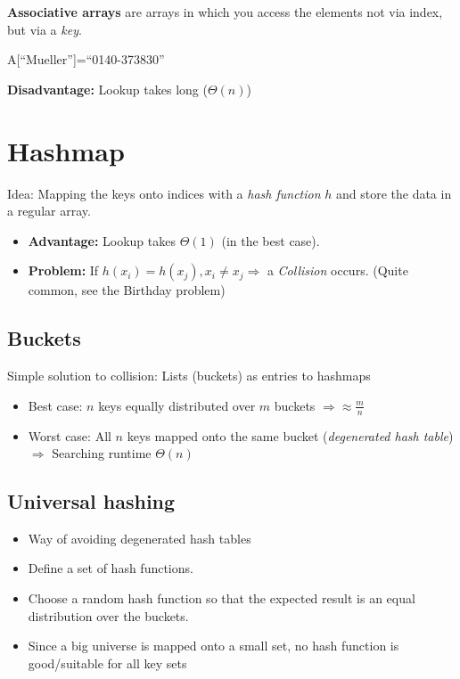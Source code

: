 \documentclass[12pt, a4paper]{scrartcl}
\begin{document}
\textbf{Associative arrays} are arrays in which you access the elements not via index, but via a \emph{key}.
\begin{center}
  A[``Mueller'']=``0140-373830''
\end{center}
\textbf{Disadvantage:} Lookup takes long ($\Theta(n)$)

\section{Hashmap}
\label{sec:hashmap}
Idea: Mapping the keys onto indices with a \emph{hash function} $h$ and store the data in a regular array.
\begin{itemize}
\item \textbf{Advantage:} Lookup takes $\Theta(1)$ (in the best case).
\item \textbf{Problem:} If $h(x_i)=h(x_j), x_i\ne x_j\Rightarrow$ a \emph{Collision} occurs. (Quite common, see the Birthday problem)
\end{itemize}

\subsection{Buckets}
\label{sec:hashmap_buckets}
Simple solution to collision: Lists (buckets) as entries to hashmaps
\begin{itemize}
\item Best case: $n$ keys equally distributed over $m$ buckets $\Rightarrow \approx \frac{m}{n}$
\item Worst case: All $n$ keys mapped onto the same bucket (\emph{degenerated hash table}) $\Rightarrow$ Searching runtime $\Theta(n)$
\end{itemize}

\subsection{Universal hashing}
\label{sec:universal_hashing}
\begin{itemize}
\item Way of avoiding degenerated hash tables
\item Define a set of hash functions.
\item Choose a random hash function so that the expected result is an equal distribution over the buckets.
\item Since a big universe is mapped onto a small set, no hash function is good/suitable for all key sets
\end{itemize}
\end{document}
